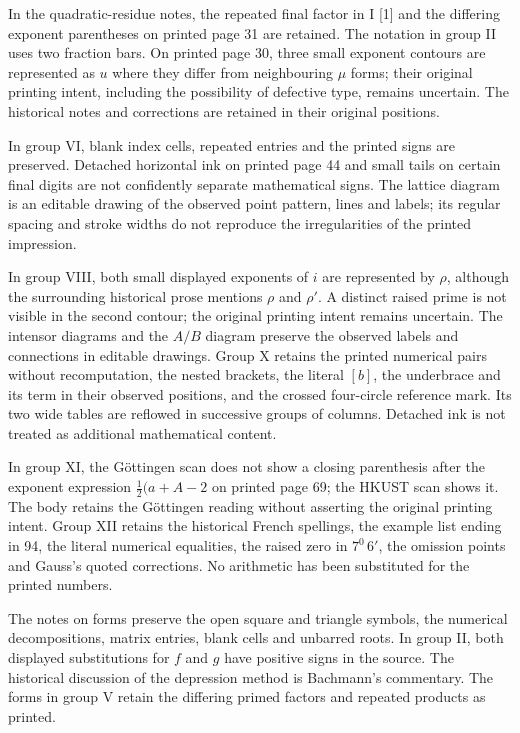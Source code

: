 In the quadratic-residue notes, the repeated final factor in I [1] and the differing exponent parentheses on printed page 31 are retained. The notation in group II uses two fraction bars. On printed page 30, three small exponent contours are represented as $u$ where they differ from neighbouring $\mu$ forms; their original printing intent, including the possibility of defective type, remains uncertain. The historical notes and corrections are retained in their original positions.

In group VI, blank index cells, repeated entries and the printed signs are preserved. Detached horizontal ink on printed page 44 and small tails on certain final digits are not confidently separate mathematical signs. The lattice diagram is an editable drawing of the observed point pattern, lines and labels; its regular spacing and stroke widths do not reproduce the irregularities of the printed impression.

In group VIII, both small displayed exponents of $i$ are represented by $\rho$, although the surrounding historical prose mentions $\rho$ and $\rho'$. A distinct raised prime is not visible in the second contour; the original printing intent remains uncertain. The intensor diagrams and the $A/B$ diagram preserve the observed labels and connections in editable drawings. Group X retains the printed numerical pairs without recomputation, the nested brackets, the literal $[b]$, the underbrace and its term in their observed positions, and the crossed four-circle reference mark. Its two wide tables are reflowed in successive groups of columns. Detached ink is not treated as additional mathematical content.

In group XI, the Göttingen scan does not show a closing parenthesis after the exponent expression $\tfrac12(a+A-2$ on printed page 69; the HKUST scan shows it. The body retains the Göttingen reading without asserting the original printing intent. Group XII retains the historical French spellings, the example list ending in 94, the literal numerical equalities, the raised zero in $7^0\,6'$, the omission points and Gauss’s quoted corrections. No arithmetic has been substituted for the printed numbers.

The notes on forms preserve the open square and triangle symbols, the numerical decompositions, matrix entries, blank cells and unbarred roots. In group II, both displayed substitutions for $f$ and $g$ have positive signs in the source. The historical discussion of the depression method is Bachmann’s commentary. The forms in group V retain the differing primed factors and repeated products as printed.

